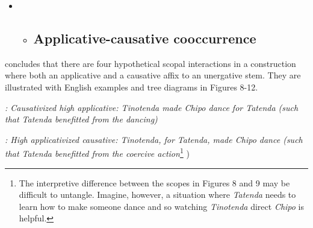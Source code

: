 \documentclass[output=paper,modfonts,nonflat]{langsci/langscibook}
\begin{document}
\begin{itemize}
\item \begin{itemize}
\item \subsection{Applicative-causative cooccurrence} 
\end{itemize}
\end{itemize}
\begin{styleDefault}
\citet{Wechsler2016} concludes that there are four hypothetical scopal interactions in a construction where both an applicative and a causative affix to an unergative stem. They are illustrated with English examples and tree diagrams in Figures 8-12. 
\end{styleDefault}

\begin{styleDefault}
  
 
\end{styleDefault}

\begin{styleDefault}
\textit{: Causativized high applicative: Tinotenda made Chipo dance for Tatenda (such that Tatenda benefitted from the dancing)}
\end{styleDefault}

\begin{styleDefault}\end{styleDefault}

 
\begin{styleDefault}
\textit{: High applicativized causative: Tinotenda, for Tatenda, made Chipo dance (such that Tatenda benefitted from the coercive action}\footnote{The interpretive difference between the scopes in Figures 8 and 9 may be difficult to untangle. Imagine, however, a situation where \textit{Tatenda} needs to learn how to make someone dance and so watching \textit{Tinotenda} direct \textit{Chipo} is helpful.} )
\end{styleDefault}

\begin{styleDefault}
  
 
\end{styleDefault}
\end{document}

